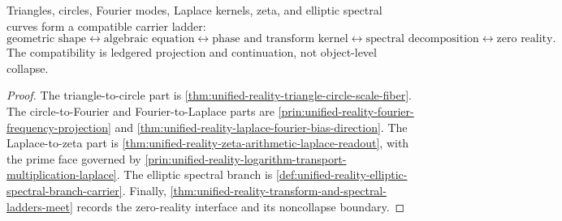 \begin{theorem}
\label{thm:unified-reality-phase-transform-zeta-ladder-principle}
Triangles, circles, Fourier modes, Laplace kernels, zeta, and elliptic
spectral curves form a compatible carrier ladder:
$$
\text{geometric shape}
\leftrightarrow
\text{algebraic equation}
\leftrightarrow
\text{phase and transform kernel}
\leftrightarrow
\text{spectral decomposition}
\leftrightarrow
\text{zero reality}.
$$
The compatibility is ledgered projection and continuation, not
object-level collapse.
\end{theorem}

\begin{proof}
The triangle-to-circle part is
\autoref{thm:unified-reality-triangle-circle-scale-fiber}. The
circle-to-Fourier and Fourier-to-Laplace parts are
\autoref{prin:unified-reality-fourier-frequency-projection} and
\autoref{thm:unified-reality-laplace-fourier-bias-direction}. The
Laplace-to-zeta part is
\autoref{thm:unified-reality-zeta-arithmetic-laplace-readout}, with the
prime face governed by
\autoref{prin:unified-reality-logarithm-transport-multiplication-laplace}.
The elliptic spectral branch is
\autoref{def:unified-reality-elliptic-spectral-branch-carrier}. Finally,
\autoref{thm:unified-reality-transform-and-spectral-ladders-meet}
records the zero-reality interface and its noncollapse boundary.
\end{proof}
